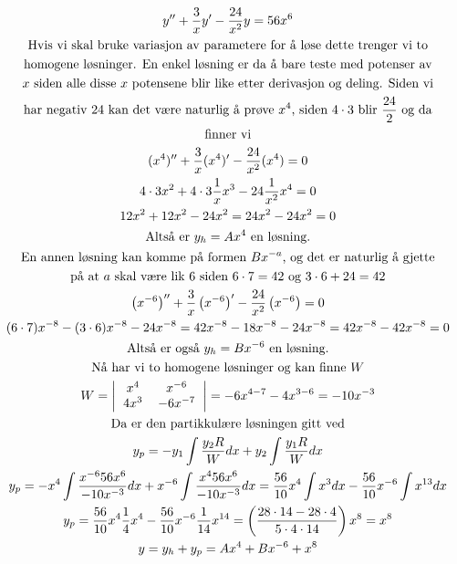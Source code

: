 \documentclass[11pt, A4paper,norsk]{article}
\begin{document}
			\begin{gather*}
y'' + \frac{3}{x} y' - \frac{24}{x^2} y = 56 x^6 \\
\text{Hvis vi skal bruke variasjon av parametere for å løse dette trenger vi to} \\
\text{homogene løsninger. En enkel løsning er da å bare teste med potenser av} \\
\text{$x$ siden alle disse $x$ potensene blir like etter derivasjon og deling. Siden vi} \\
\text{har negativ $24$ kan det være naturlig å prøve $x^{4}$, siden $4 \cdot 3$ blir $\frac{24}{2}$ og da} \\
\text{finner vi} \\
(x^4)'' + \frac{3}{x} (x^4)' - \frac{24}{x^2} (x^4) = 0 \\
4 \cdot 3 x^2 + 4 \cdot 3 \frac{1}{x} x^3 - 24 \frac{1}{x^2} x^4 = 0 \\
12x^2 + 12x^2 - 24x^2 = 24x^2 - 24x^2 = 0 \\
\text{Altså er $y_h = Ax^{4}$ en løsning.} \\
\text{En annen løsning kan komme på formen $Bx^{-a}$, og det er naturlig å gjette} \\
\text{på at $a$ skal være lik $6$ siden $6 \cdot 7 = 42$ og $3 \cdot 6 + 24 = 42$} \\
\left( x^{- 6} \right)'' + \frac{3}{x} \left( x^{- 6} \right)' - \frac{24}{x^2} \left( x^{- 6} \right) = 0 \\
(6 \cdot 7) x^{- 8} - ( 3 \cdot 6 ) x^{- 8} - 24 x^{- 8} = 42 x^{- 8} - 18 x^{- 8} - 24 x^{- 8} = 42 x^{- 8} - 42 x^{- 8} = 0 \\
\text{Altså er også $y_h = Bx^{-6}$ en løsning.} \\
\text{Nå har vi to homogene løsninger og kan finne $W$} \\
W = \left|
	\begin{tabular}{ cc }
$x^4$ & $x^{- 6}$ \\
$4x^3$ & $- 6 x^{- 7}$
	\end{tabular}
\right| = - 6 x^{4 - 7} - 4 x^{3 - 6} = - 10 x^{- 3} \\
\text{Da er den partikkulære løsningen gitt ved} \\
y_p = - y_1 \int \frac{y_2 R}{W} dx + y_2 \int \frac{y_1 R}{W} dx \\
y_p = - x^4 \int \frac{x^{-6} 56x^{6}}{- 10x^{-3}} dx + x^{-6} \int \frac{x^{4} 56x^{6}}{- 10x^{- 3}} dx = \frac{56}{10} x^{4} \int x^{3} dx - \frac{56}{10} x^{- 6} \int x^{13} dx \\
y_p = \frac{56}{10} x^{4} \frac{1}{4} x^{4} - \frac{56}{10} x^{- 6} \frac{1}{14} x^{14} = \left( \frac{28 \cdot 14 - 28 \cdot 4}{5 \cdot 4 \cdot 14} \right) x^{8} = x^8 \\
y = y_h + y_p = Ax^{4} + Bx^{-6} + x^{8}
			\end{gather*}
\end{document}
